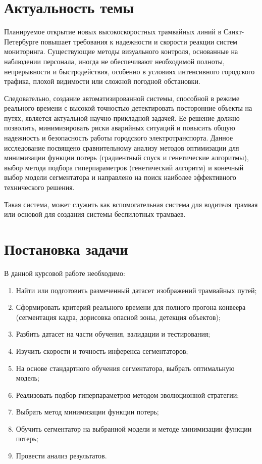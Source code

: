 \documentclass[areasetadvanced]{scrartcl}
\begin{document}
\newpage
\section{Актуальность темы}
Планируемое открытие новых высокоскоростных трамвайных линий в Санкт-Петербурге повышает требования к надежности и скорости реакции систем мониторинга.
Существующие методы визуального контроля, основанные на наблюдении персонала, иногда не обеспечивают необходимой полноты, непрерывности и быстродействия,  
особенно в условиях интенсивного городского трафика, плохой видимости или сложной погодной обстановки.

Следовательно, создание автоматизированной системы, способной в режиме реального времени с высокой точностью детектировать посторонние объекты на путях, 
является актуальной научно-прикладной задачей. Ее решение должно позволить, минимизировать риски аварийных ситуаций и повысить 
общую надежность и безопасность работы городского электротранспорта. Данное исследование посвящено сравнительному анализу методов оптимизации для минимизации функции потерь (градиентный спуск и генетические алгоритмы), выбор метода подбора гиперпараметров (генетический алгоритм) и конечный выбор модели сегментатора и направлено на поиск наиболее эффективного технического решения.

Такая система, может служить как вспомогательная система для водителя трамвая или основой для создания системы беспилотных трамваев.

\newpage
\section{Постановка задачи}
В данной курсовой работе необходимо:
\begin{enumerate}
    \item Найти или подготовить размеченный датасет изображений трамвайных путей;
    \item Сформировать критерий реального времени для полного прогона конвеера (сегментация кадра, дорисовка опасной зоны, детекция объектов);
    \item Разбить датасет на части обучения, валидации и тестирования;
    \item Изучить скорости и точность инференса сегментаторов;
    \item На основе стандартного обучения сегментатора, выбрать оптимальную модель;
    \item Реализовать подбор гиперпараметров методом эволюционной стратегии;
    \item Выбрать метод минимизации функции потерь;
    \item Обучить сегментатор на выбранной модели и методе минимизации функции потерь;
    \item Провести анализ результатов.
\end{enumerate}
\end{document}

